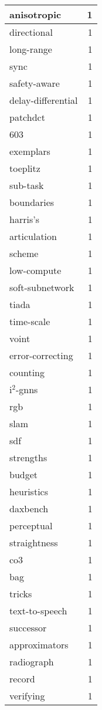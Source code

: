 \begin{table}[h]
\begin{tabular}{|l|r|}
anisotropic & 1 \\
\hline
directional & 1 \\
\hline
long-range & 1 \\
\hline
sync & 1 \\
\hline
safety-aware & 1 \\
\hline
delay-differential & 1 \\
\hline
patchdct & 1 \\
\hline
603 & 1 \\
\hline
exemplars & 1 \\
\hline
toeplitz & 1 \\
\hline
sub-task & 1 \\
\hline
boundaries & 1 \\
\hline
harris's & 1 \\
\hline
articulation & 1 \\
\hline
scheme & 1 \\
\hline
low-compute & 1 \\
\hline
soft-subnetwork & 1 \\
\hline
tiada & 1 \\
\hline
time-scale & 1 \\
\hline
voint & 1 \\
\hline
error-correcting & 1 \\
\hline
counting & 1 \\
\hline
i$^2$-gnns & 1 \\
\hline
rgb & 1 \\
\hline
slam & 1 \\
\hline
sdf & 1 \\
\hline
strengths & 1 \\
\hline
budget & 1 \\
\hline
heuristics & 1 \\
\hline
daxbench & 1 \\
\hline
perceptual & 1 \\
\hline
straightness & 1 \\
\hline
co3 & 1 \\
\hline
bag & 1 \\
\hline
tricks & 1 \\
\hline
text-to-speech & 1 \\
\hline
successor & 1 \\
\hline
approximators & 1 \\
\hline
radiograph & 1 \\
\hline
record & 1 \\
\hline
verifying & 1 \\

\end{tabular}
\end{table}
